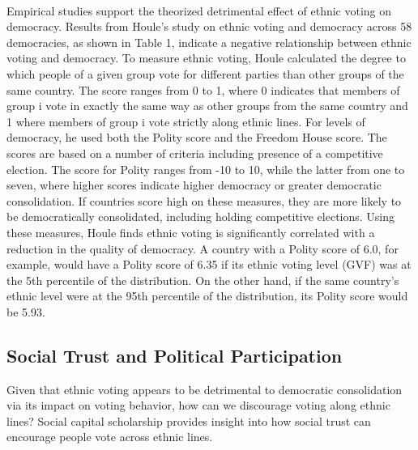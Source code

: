 \documentclass[a4paper, 12pt]{article}
\begin{document}
\paragraph{} 
Empirical studies support the theorized detrimental effect of ethnic voting on democracy. Results from Houle’s\cite{houleDoesEthnicVoting2018} study on ethnic voting and democracy across 58 democracies, as shown in Table 1, indicate a negative relationship between ethnic voting and democracy. To measure ethnic voting, Houle calculated the degree to which people of a given group vote for different parties than other groups of the same country. The score ranges from 0 to 1, where 0 indicates that members of group i vote in exactly the same way as other groups from the same country and 1 where members of group i vote strictly along ethnic lines. For levels of democracy, he used both the Polity score and the Freedom House score. The scores are based on a number of criteria including presence of a competitive election. The score for Polity ranges from -10 to 10, while the latter from one to seven, where higher scores indicate higher democracy or greater democratic consolidation. If countries score high on these measures, they are more likely to be democratically consolidated, including holding competitive elections. Using these measures, Houle finds ethnic voting is significantly correlated with a reduction in the quality of democracy. A country with a Polity score of 6.0, for example, would have a Polity score of 6.35 if its ethnic voting level (GVF)   was at the 5th percentile of the distribution. On the other hand, if the same country’s ethnic level were at the 95th percentile of the distribution, its Polity score would be 5.93. 
\subsection{Social Trust and Political Participation}
Given that ethnic voting appears to be detrimental to democratic consolidation via its impact on voting behavior, how can we discourage voting along ethnic lines? Social capital scholarship provides insight into how social trust can encourage people vote across ethnic lines.
\end{document}
